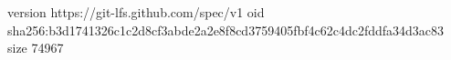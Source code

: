 version https://git-lfs.github.com/spec/v1
oid sha256:b3d1741326c1c2d8cf3abde2a2e8f8cd3759405fbf4c62c4dc2fddfa34d3ac83
size 74967
